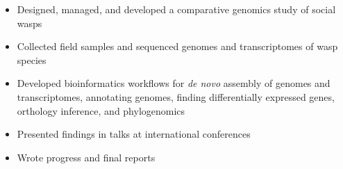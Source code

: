 \documentclass[10pt,a4paper,ragged2e,withhyper]{altacv}
\begin{document}
\begin{paracol}{2}
\begin{itemize}
\item Designed, managed, and developed a comparative genomics study of social wasps
\item Collected field samples and sequenced genomes and transcriptomes of wasp species
\item Developed bioinformatics workflows for \textit{de novo} assembly of genomes and transcriptomes,
annotating genomes, finding differentially expressed genes, orthology inference, and phylogenomics 
\item Presented findings in talks at international conferences
\item Wrote progress and final reports
\end{itemize}








\newpage




\end{paracol}
\end{document}
